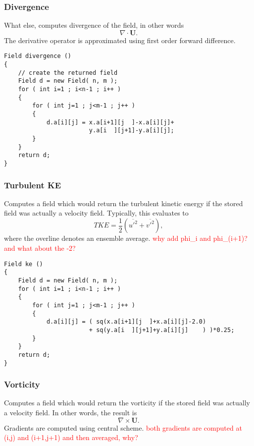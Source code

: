 \documentclass[notitlepage]{article}
\begin{document}
\subsubsection{Divergence}

What else, computes divergence of the field, in other words
%
\begin{equation}
\nabla \cdot \mathbf{U} .
\end{equation}
%
The derivative operator is approximated using first order forward difference.

\begin{lstlisting}[style=myCpp]
Field divergence ()
{
	// create the returned field
	Field d = new Field( n, m );
	for ( int i=1 ; i<n-1 ; i++ )
	{
		for ( int j=1 ; j<m-1 ; j++ )
		{
			d.a[i][j] = x.a[i+1][j  ]-x.a[i][j]+
						y.a[i  ][j+1]-y.a[i][j];
		}
	}
	return d;
}
\end{lstlisting}

\subsubsection{Turbulent KE}

Computes a field which would return the turbulent kinetic energy if the stored
field was actually a velocity field. Typically, this evaluates to
%
\begin{equation}
TKE = \frac{1}{2} \left( \overline{u'^2} + \overline{v'^2} \right),
\end{equation}
%
where the overline denotes an ensemble average.
\textcolor{red}{why add phi\_i and phi\_(i+1)? and what about the -2?}

\begin{lstlisting}[style=myCpp]
Field ke ()
{
	Field d = new Field( n, m );
	for ( int i=1 ; i<n-1 ; i++ )
	{
		for ( int j=1 ; j<m-1 ; j++ )
		{
			d.a[i][j] = ( sq(x.a[i+1][j  ]+x.a[i][j]-2.0)
				 		+ sq(y.a[i  ][j+1]+y.a[i][j]    ) )*0.25;
		}
	}
	return d;
}
\end{lstlisting}

\subsubsection{Vorticity}

Computes a field which would return the vorticity if the stored
field was actually a velocity field. In other words, the result is
%
\begin{equation}
\nabla \times \mathbf{U}.
\end{equation}
%
Gradients are computed using central scheme.
\textcolor{red}{both gradients are computed at (i,j) and (i+1,j+1) and
then averaged, why?}
\end{document}
